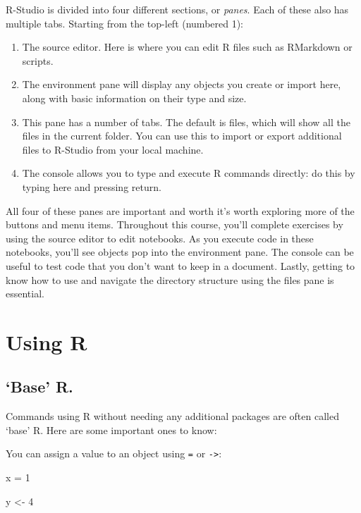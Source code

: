 \documentclass[
]{book}
\newenvironment{Shaded}{\begin{snugshade}}{\end{snugshade}}
\newcommand{\DecValTok}[1]{\textcolor[rgb]{0.00,0.00,0.81}{#1}}
\newcommand{\NormalTok}[1]{#1}
\newcommand{\OtherTok}[1]{\textcolor[rgb]{0.56,0.35,0.01}{#1}}
\begin{document}
R-Studio is divided into four different sections, or \emph{panes}. Each of these also has multiple tabs. Starting from the top-left (numbered 1):

\begin{enumerate}
\def\labelenumi{\arabic{enumi}.}
\item
  The source editor. Here is where you can edit R files such as RMarkdown or scripts.
\item
  The environment pane will display any objects you create or import here, along with basic information on their type and size.
\item
  This pane has a number of tabs. The default is files, which will show all the files in the current folder. You can use this to import or export additional files to R-Studio from your local machine.
\item
  The console allows you to type and execute R commands directly: do this by typing here and pressing return.
\end{enumerate}

All four of these panes are important and worth it's worth exploring more of the buttons and menu items. Throughout this course, you'll complete exercises by using the source editor to edit notebooks. As you execute code in these notebooks, you'll see objects pop into the environment pane. The console can be useful to test code that you don't want to keep in a document. Lastly, getting to know how to use and navigate the directory structure using the files pane is essential.

\hypertarget{using-r}{%
\section{Using R}\label{using-r}}

\hypertarget{base-r.}{%
\subsection{`Base' R.}\label{base-r.}}

Commands using R without needing any additional packages are often called `base' R. Here are some important ones to know:

You can assign a value to an object using \texttt{=} or \texttt{-\textgreater{}}:

\begin{Shaded}
\begin{Highlighting}[]
\NormalTok{x }\OtherTok{=} \DecValTok{1}

\NormalTok{y }\OtherTok{\textless{}{-}} \DecValTok{4}
\end{Highlighting}
\end{Shaded}
\end{document}
